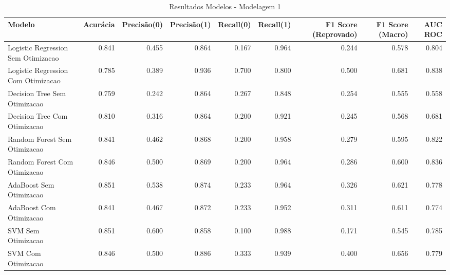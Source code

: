 \begin{table}[H] %
    \centering
    \caption{Resultados Modelos - Modelagem 1}
    \label{tab:resultados_modelagem_1}
    \renewcommand{\arraystretch}{1.25} %
    \begin{adjustwidth}{ -1in }{ -1in } %
    \centering %
    \small %
    \begin{tabular}{lrrrrrrrr}
\toprule
                            Modelo &  Acurácia &  Precisão(0) &  Precisão(1) &  Recall(0) &  Recall(1) &  F1 Score (Reprovado) &  F1 Score (Macro) &  AUC ROC \\
\midrule
Logistic Regression Sem Otimizacao &     0.841 &        0.455 &        0.864 &      0.167 &      0.964 &                 0.244 &             0.578 &    0.804 \\
Logistic Regression Com Otimizacao &     0.785 &        0.389 &        0.936 &      0.700 &      0.800 &                 0.500 &             0.681 &    0.838 \\
      Decision Tree Sem Otimizacao &     0.759 &        0.242 &        0.864 &      0.267 &      0.848 &                 0.254 &             0.555 &    0.558 \\
      Decision Tree Com Otimizacao &     0.810 &        0.316 &        0.864 &      0.200 &      0.921 &                 0.245 &             0.568 &    0.681 \\
      Random Forest Sem Otimizacao &     0.841 &        0.462 &        0.868 &      0.200 &      0.958 &                 0.279 &             0.595 &    0.822 \\
      Random Forest Com Otimizacao &     0.846 &        0.500 &        0.869 &      0.200 &      0.964 &                 0.286 &             0.600 &    0.836 \\
           AdaBoost Sem Otimizacao &     0.851 &        0.538 &        0.874 &      0.233 &      0.964 &                 0.326 &             0.621 &    0.778 \\
           AdaBoost Com Otimizacao &     0.841 &        0.467 &        0.872 &      0.233 &      0.952 &                 0.311 &             0.611 &    0.774 \\
                SVM Sem Otimizacao &     0.851 &        0.600 &        0.858 &      0.100 &      0.988 &                 0.171 &             0.545 &    0.785 \\
                SVM Com Otimizacao &     0.846 &        0.500 &        0.886 &      0.333 &      0.939 &                 0.400 &             0.656 &    0.779 \\
\bottomrule
\end{tabular}
    \end{adjustwidth}
    \renewcommand{\arraystretch}{1.0} %
\end{table}

